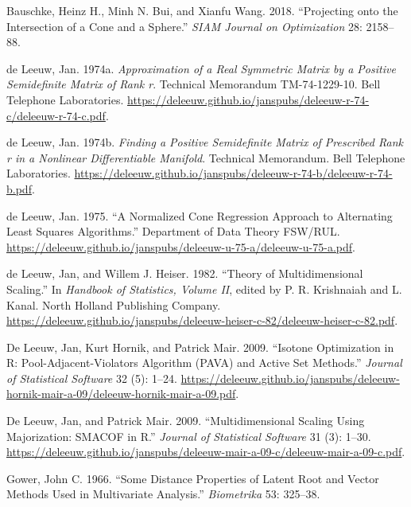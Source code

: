 \documentclass[
  12pt,
  letterpaper,
  DIV=11,
  numbers=noendperiod]{scrartcl}
\newlength{\cslhangindent}
\newenvironment{CSLReferences}[2] %
 {\begin{list}{}{%
  \setlength{\itemindent}{0pt}
  \setlength{\leftmargin}{0pt}
  \setlength{\parsep}{0pt}
  \ifodd #1
   \setlength{\leftmargin}{\cslhangindent}
   \setlength{\itemindent}{-1\cslhangindent}
  \fi
  \setlength{\itemsep}{#2\baselineskip}}}
 {\end{list}}
\begin{document}
\protect{}\label{refs}
\begin{CSLReferences}{1}{1}
Bauschke, Heinz H., Minh N. Bui, and Xianfu Wang. 2018. {``{Projecting
onto the Intersection of a Cone and a Sphere}.''} \emph{SIAM Journal on
Optimization} 28: 2158--88.

{de Leeuw, Jan}. 1974a. \emph{{Approximation of a Real Symmetric Matrix
by a Positive Semidefinite Matrix of Rank r}}. Technical Memorandum
TM-74-1229-10. Bell Telephone Laboratories.
\url{https://deleeuw.github.io/janspubs/deleeuw-r-74-c/deleeuw-r-74-c.pdf}.

{de Leeuw, Jan}. 1974b. \emph{{Finding a Positive Semidefinite Matrix of
Prescribed Rank r in a Nonlinear Differentiable Manifold}}. Technical
Memorandum. Bell Telephone Laboratories.
\url{https://deleeuw.github.io/janspubs/deleeuw-r-74-b/deleeuw-r-74-b.pdf}.

{de Leeuw, Jan}. 1975. {``{A Normalized Cone Regression Approach to
Alternating Least Squares Algorithms}.''} Department of Data Theory
FSW/RUL.
\url{https://deleeuw.github.io/janspubs/deleeuw-u-75-a/deleeuw-u-75-a.pdf}.

{de Leeuw, Jan, and Willem J. Heiser}. 1982. {``{Theory of
Multidimensional Scaling}.''} In \emph{Handbook of Statistics, Volume
{II}}, edited by P. R. Krishnaiah and L. Kanal. North Holland Publishing
Company.
\url{https://deleeuw.github.io/janspubs/deleeuw-heiser-c-82/deleeuw-heiser-c-82.pdf}.

De Leeuw, Jan, Kurt Hornik, and Patrick Mair. 2009. {``{Isotone
Optimization in R: Pool-Adjacent-Violators Algorithm (PAVA) and Active
Set Methods}.''} \emph{Journal of Statistical Software} 32 (5): 1--24.
\url{https://deleeuw.github.io/janspubs/deleeuw-hornik-mair-a-09/deleeuw-hornik-mair-a-09.pdf}.

De Leeuw, Jan, and Patrick Mair. 2009. {``{Multidimensional Scaling
Using Majorization: SMACOF in R}.''} \emph{Journal of Statistical
Software} 31 (3): 1--30.
\url{https://deleeuw.github.io/janspubs/deleeuw-mair-a-09-c/deleeuw-mair-a-09-c.pdf}.

Gower, John C. 1966. {``{Some Distance Properties of Latent Root and
Vector Methods Used in Multivariate Analysis}.''} \emph{Biometrika} 53:
325--38.


\end{CSLReferences}
\end{document}
